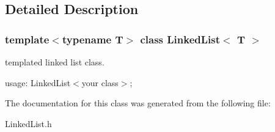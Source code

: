 \subsection{Detailed Description}
\subsubsection*{template$<$typename T$>$\newline
class Linked\+List$<$ T $>$}

templated linked list class. 

usage\+: Linked\+List$<$your class$>$; 

The documentation for this class was generated from the following file\+:\begin{DoxyCompactItemize}
\item 
Linked\+List.\+h\end{DoxyCompactItemize}
